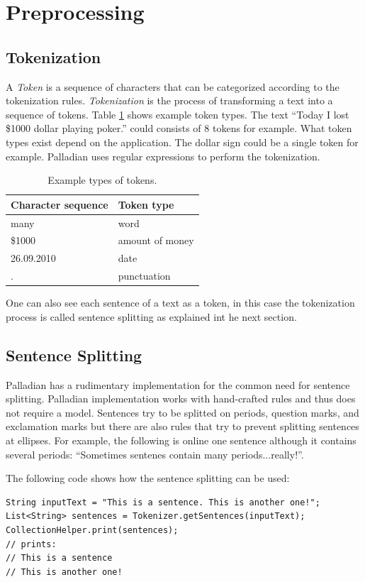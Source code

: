 
\section{Preprocessing}
\subsection{Tokenization}
A \textit{Token} is a sequence of characters that can be categorized according to the tokenization rules. \textit{Tokenization} is the process of transforming a text into a sequence of tokens. Table \ref{tab:tokenTypes} shows example token types. The text ``Today I lost \$1000 dollar playing poker.'' could consists of 8 tokens for example. What token types exist depend on the application. The dollar sign could be a single token for example. Palladian uses regular expressions to perform the tokenization.

\begin{table}[ht!]
\centering
\begin{tabular}{|l|l|}
\hline
Character sequence		& Token type \\
\hline
many			& word \\
\hline
\$1000		& amount of money  \\
\hline
26.09.2010	& date \\
\hline
.				& punctuation \\
\hline
\end{tabular} 
\caption{Example types of tokens.}
\label{tab:tokenTypes}
\end{table}

One can also see each sentence of a text as a token, in this case the tokenization process is called sentence splitting as explained int he next section.

\subsection{Sentence Splitting}
Palladian has a rudimentary implementation for the common need for sentence splitting. Palladian implementation works with hand-crafted rules and thus does not require a model. Sentences try to be splitted on periods, question marks, and exclamation marks but there are also rules that try to prevent splitting sentences at ellipses. For example, the following is online one sentence although it contains several periods: ``Sometimes sentenes contain many periods...really!''.

The following code shows how the sentence splitting can be used:
\begin{codelisting}
\begin{lstlisting}[caption=Using the sentence splitter.,frame=tb]
String inputText = "This is a sentence. This is another one!";
List<String> sentences = Tokenizer.getSentences(inputText);
CollectionHelper.print(sentences);
// prints:
// This is a sentence
// This is another one!
\end{lstlisting}
\end{codelisting}

